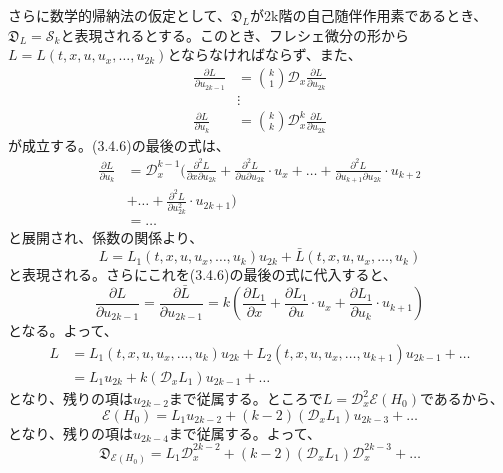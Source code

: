 \documentclass[a4paper, 11pt]{report}
\theoremstyle{definition}
\begin{document}
 さらに数学的帰納法の仮定として、$\mathfrak{D}_L$が2k階の自己随伴作用素であるとき、$\mathfrak{D}_L=\mathcal{S}_k$と表現されるとする。このとき、フレシェ微分の形から$L=L(t,x,u,u_x,\dots,u_{2k})$とならなければならず、また、
\begin{align}
\frac{\partial L}{\partial u_{2k-1}} &= \binom{k}{1}\mathcal{D}_x\frac{\partial L}{\partial u_{2k}}\nonumber\\
&\vdots\nonumber\\
\frac{\partial L}{\partial u_k} &= \binom{k}{k}\mathcal{D}_x^k\frac{\partial L}{\partial u_{2k}}  %
\end{align}
が成立する。(3.4.6)の最後の式は、
\begin{align*}
\frac{\partial L}{\partial u_k}  &= \mathcal{D}_x^{k-1}(\frac{{\partial}^2 L}{\partial x\partial u_{2k}} + \frac{{\partial}^2 L}{\partial u\partial u_{2k}}\cdot u_x + \dots + \frac{{\partial}^2 L}{\partial u_{k+1}\partial u_{2k}}\cdot u_{k+2}\\
&+ \dots + \frac{{\partial}^2 L}{\partial u_{2k}^2}\cdot u_{2k+1})\\
&= \dots
\end{align*}
と展開され、係数の関係より、
\begin{equation*}
L = L_1(t,x,u,u_x,\dots ,u_k)u_{2k} + \bar{L}(t,x,u,u_x,\dots ,u_k)
\end{equation*}
と表現される。さらにこれを(3.4.6)の最後の式に代入すると、
\begin{equation*}
\frac{\partial L}{\partial u_{2k-1}} = \frac{\partial \bar{L}}{\partial u_{2k-1}} = k(\frac{\partial L_1}{\partial x}+\frac{\partial L_1}{\partial u}\cdot u_x + \frac{\partial L_1}{\partial u_k}\cdot u_{k+1})
\end{equation*}
となる。よって、
\begin{align}
L &= L_1(t,x,u,u_x,\dots ,u_k)u_{2k} + L_2(t,x,u,u_x,\dots ,u_{k+1})u_{2k-1} + \dots \nonumber\\
&= L_1u_{2k} + k(\mathcal{D}_xL_1)u_{2k-1} + \dots  %
\end{align}
となり、残りの項は$u_{2k-2}$まで従属する。ところで$L=\mathcal{D}_x^2\mathcal{E}(H_0)$であるから、
\begin{equation*}
\mathcal{E}(H_0) = L_1u_{2k-2} + (k-2)(\mathcal{D}_xL_1)u_{2k-3} + \dots
\end{equation*}
となり、残りの項は$u_{2k-4}$まで従属する。よって、
\begin{equation*}
\mathfrak{D}_{\mathcal{E}(H_0)} = L_1\mathcal{D}_x^{2k-2} + (k-2)(\mathcal{D}_xL_1)\mathcal{D}_x^{2k-3} + \dots
\end{equation*}
\end{document}
